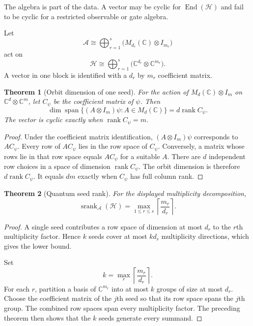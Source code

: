 \documentclass{aomart}
\newtheorem{theorem}{Theorem}[section]
\theoremstyle{definition}
\theoremstyle{remark}
\newcommand{\CC}{\mathbb C}
\newcommand{\Hcal}{\mathcal H}
\newcommand{\Acal}{\mathcal A}
\newcommand{\End}{\operatorname{End}}
\newcommand{\rank}{\operatorname{rank}}
\begin{document}
The algebra is part of the data. A vector may be cyclic for \(\End(\Hcal)\) and fail to be cyclic for a restricted observable or gate algebra.

Let
\[
\Acal
\cong
\bigoplus_{r=1}^{s}
\bigl(M_{d_r}(\CC)\otimes I_{m_r}\bigr)
\]
act on
\[
\Hcal
\cong
\bigoplus_{r=1}^{s}
\bigl(\CC^{d_r}\otimes\CC^{m_r}\bigr).
\]
A vector in one block is identified with a \(d_r\) by \(m_r\) coefficient matrix.

\begin{theorem}[Orbit dimension of one seed]\label{thm:orbit_dimension}
For the action of \(M_d(\CC)\otimes I_m\) on \(\CC^d\otimes\CC^m\), let \(C_\psi\) be the coefficient matrix of \(\psi\). Then
\[
\dim\operatorname{span}\{(A\otimes I_m)\psi:A\in M_d(\CC)\}
=
 d\rank C_\psi.
\]
The vector is cyclic exactly when \(\rank C_\psi=m\).
\end{theorem}

\begin{proof}
Under the coefficient matrix identification, \((A\otimes I_m)\psi\) corresponds to \(AC_\psi\). Every row of \(AC_\psi\) lies in the row space of \(C_\psi\). Conversely, a matrix whose rows lie in that row space equals \(AC_\psi\) for a suitable \(A\). There are \(d\) independent row choices in a space of dimension \(\rank C_\psi\). The orbit dimension is therefore \(d\rank C_\psi\). It equals \(dm\) exactly when \(C_\psi\) has full column rank.
\end{proof}

\begin{theorem}[Quantum seed rank]\label{thm:quantum_seed_rank}
For the displayed multiplicity decomposition,
\[
\operatorname{srank}_{\Acal}(\Hcal)
=
\max_{1\le r\le s}
\left\lceil\frac{m_r}{d_r}\right\rceil.
\]
\end{theorem}

\begin{proof}
A single seed contributes a row space of dimension at most \(d_r\) to the \(r\)th multiplicity factor. Hence \(k\) seeds cover at most \(kd_r\) multiplicity directions, which gives the lower bound.

Set
\[
k=\max_r\left\lceil\frac{m_r}{d_r}\right\rceil.
\]
For each \(r\), partition a basis of \(\CC^{m_r}\) into at most \(k\) groups of size at most \(d_r\). Choose the coefficient matrix of the \(j\)th seed so that its row space spans the \(j\)th group. The combined row spaces span every multiplicity factor. The preceding theorem then shows that the \(k\) seeds generate every summand.
\end{proof}
\end{document}
